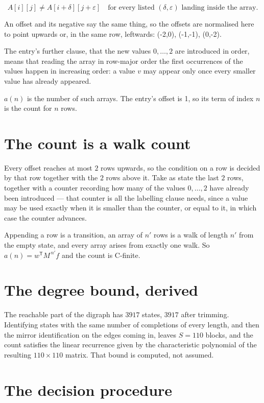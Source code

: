 \documentclass[11pt]{article}
\theoremstyle{definition}
\begin{document}
\[A[i][j] \ne A[i{+}\delta][j{+}\varepsilon]\quad\text{for every listed }(\delta,\varepsilon)\text{ landing inside the array.}\]

An offset and its negative say the same thing, so the offsets are normalised here to point upwards or, in the same row, leftwards: (-2,0), (-1,-1), (0,-2).

The entry's further clause, that the new values $0,\dots,2$ are introduced in order, means that reading the array in row-major order the first occurrences of the values happen in increasing order: a value $v$ may appear only once every smaller value has already appeared.

$a(n)$ is the number of such arrays. The entry's offset is 1, so its term of index $n$ is the count for $n$ rows.

\section{The count is a walk count}

Every offset reaches at most $2$ rows upwards, so the condition on a row is decided by that row together with the $2$ rows above it. Take as state the last $2$ rows, together with a counter recording how many of the values $0,\dots,2$ have already been introduced --- that counter is all the labelling clause needs, since a value may be used exactly when it is smaller than the counter, or equal to it, in which case the counter advances.

Appending a row is a transition, an array of $n'$ rows is a walk of length $n'$ from the empty state, and every array arises from exactly one walk. So $a(n) = w^{\mathsf T}M^{\,n'}f$ and the count is C-finite.

\section{The degree bound, derived}

The reachable part of the digraph has $3917$ states, $3917$ after trimming. Identifying states with the same number of completions of every length, and then the mirror identification on the edges coming in, leaves $S = 110$ blocks, and the count satisfies the linear recurrence given by the characteristic polynomial of the resulting $110\times110$ matrix. That bound is computed, not assumed.

\section{The decision procedure}
\end{document}
